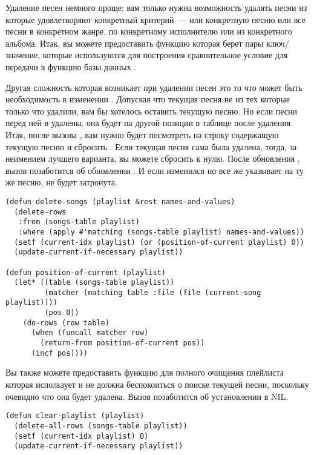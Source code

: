 Удаление песен немного проще; вам только нужна возможность удалять песни из
 которые удовлетворяют конкретный критерий~--- или конкретную песню или
все песни в конкретном жанре, по конкретному исполнителю или из конкретного альбома. Итак,
вы можете предоставить функцию  которая берет пары ключ/значение,
которые используются для построения сравнительное условие  для передачи в функцию
базы данных .

Другая сложность которая возникает при удалении песен это то что может быть необходимость
в изменении . Допуская что текущая песня не из тех которые только что
удалили, вам бы хотелось оставить текущую песню. Но если песни перед ней в
 удалены, она будет на другой позиции в таблице после удаления. Итак,
после вызова , вам нужно будет посмотреть на строку содержащую текущую
песню и сбросить . Если текущая песня сама была удалена, тогда, за
неимением лучшего варианта, вы можете сбросить  к нулю. После обновления
, вызов  позаботится об обновлении
. И если  изменился но все же указывает на ту же
песню,  не будет затронута.

\begin{lstlisting}
(defun delete-songs (playlist &rest names-and-values)
  (delete-rows
   :from (songs-table playlist)
   :where (apply #'matching (songs-table playlist) names-and-values))
  (setf (current-idx playlist) (or (position-of-current playlist) 0))
  (update-current-if-necessary playlist))

(defun position-of-current (playlist)
  (let* ((table (songs-table playlist))
         (matcher (matching table :file (file (current-song playlist))))
         (pos 0))
    (do-rows (row table)
      (when (funcall matcher row)
        (return-from position-of-current pos))
      (incf pos))))
\end{lstlisting}

Вы также можете предоставить функцию для полного очищения плейлиста которая использует
 и не должна беспокоиться о поиске текущей песни, поскольку очевидно
что она будет удалена. Вызов  позаботится об
установлении  в NIL.

\begin{lstlisting}
(defun clear-playlist (playlist)
  (delete-all-rows (songs-table playlist))
  (setf (current-idx playlist) 0)
  (update-current-if-necessary playlist))
\end{lstlisting}

